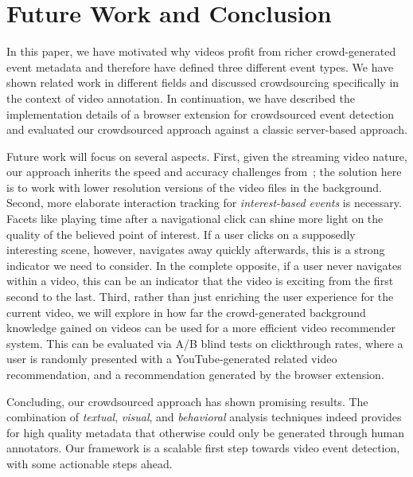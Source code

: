 \documentclass[runningheads,a4paper]{llncs}
\begin{document}
\section{Future Work and Conclusion} \label{sec:future-work-conclusion}
In this paper, we have motivated why videos profit from richer crowd-generated event metadata and therefore have defined three different event types. We have shown related work in different fields and discussed crowdsourcing specifically in the context of video annotation. In continuation, we have described the implementation details of a browser extension for crowdsourced event detection and evaluated our crowdsourced approach against a classic server-based approach.

Future work will focus on several aspects. First, given the streaming video nature, our approach inherits the speed and accuracy challenges from~\cite{artemis}; the solution here is to work with lower resolution versions of the video files in the background. Second, more elaborate interaction tracking for \emph{interest-based events} is necessary. Facets like playing time after a navigational click can shine more light on the quality of the believed point of interest. If a user clicks on a supposedly interesting scene, however, navigates away quickly afterwards, this is a strong indicator we need to consider. In the complete opposite, if a user never navigates within a video, this can be an indicator that the video is exciting from the first second to the last. Third, rather than just enriching the user experience for the current video, we will explore in how far the crowd-generated background knowledge gained on videos can be used for a more efficient video recommender system. This can be evaluated via A/B blind tests on clickthrough rates, where a user is randomly presented with a YouTube-generated related video recommendation, and a recommendation generated by the browser extension. 

 Concluding, our crowdsourced approach has shown promising results. The combination of \emph{textual}, \emph{visual}, and \emph{behavioral} analysis techniques indeed provides for high quality metadata that otherwise could only be generated through human annotators. Our framework is a scalable first step towards video event detection, with some actionable steps ahead.

\renewcommand{\ttdefault}{cmvtt}
\renewcommand\UrlFont\tt



\end{document}
